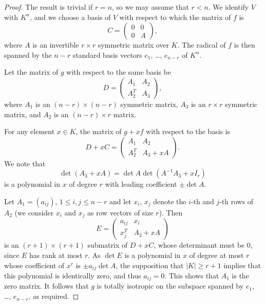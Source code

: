 \documentclass{amsart}
\theoremstyle{plain}
\theoremstyle{definition}
\begin{document}
\begin{proof}
 
The result is trivial if $r=n$, so we may assume that $r<n$. We identify $V$ with $K^n$, and we choose a basis of $V$ with respect to which the
matrix of $f$ is
\[
C=\left(
\begin{array}
{cc}
        0&0\\
        0&A    
\end{array}
\right),
\] 
where $A$ is an invertible $r\times r$ symmetric matrix over $K$. The radical
of $f$ is then spanned by the $n-r$ standard basis vectors $e_1$, \dots, $e_{n-r}$ of $K^n$. 

Let the matrix of $g$ with respect to the same basis be
\[
 D=\left(
\begin{array}
{cc}
        A_1&A_2\\
        A_2^T&A_3    
\end{array}
\right),
\] 
where $A_1$ is an $(n-r)\times (n-r)$ symmetric matrix, $A_3$ is an $r\times r$ symmetric matrix, 
and $A_2$ is an $(n-r)\times r$ matrix.

For any element $x\in K$, the matrix of $g+xf$ with respect to the basis is
\[
 D+xC=
\left(
\begin{array}
{cc}
        A_1&A_2\\
        A_2^T&A_3+xA    
\end{array}
\right).
\]
We note that 
\[
 \det(A_3+xA)=\det A\det (A^{-1}A_3+xI_r)
\]
is a polynomial in $x$ of degree $r$ with leading coefficient $\pm \det A$.

Let $A_1=(a_{ij})$, $1\leq i,j\leq n-r$ and let $x_i$, $x_j$ denote the $i$-th and $j$-th rows of $A_2$ (we consider $x_i$ and $x_j$ as
row vectors of size $r$). Then
\[
 E=
\left(
\begin{array}
{cc}
        a_{ij}&x_i\\
        x_j^T&A_3+xA    
\end{array}
\right)
\]
is an $(r+1)\times (r+1)$ submatrix of $D+xC$, whose determinant must be $0$, since $E$ has rank at most $r$. As $\det E$ is a polynomial in
$x$ of degree at most $r$  whose coefficient of $x^r$ is $\pm a_{ij}\det A$, the supposition that $|K|\geq r+1$ implies that this polynomial is identically zero, and thus $a_{ij}=0$. This shows that $A_1$ is the zero matrix. It follows that $g$ is totally isotropic on the subspace spanned by
$e_1$, \dots, $e_{n-r}$, as required.

\end{proof}
\end{document}
